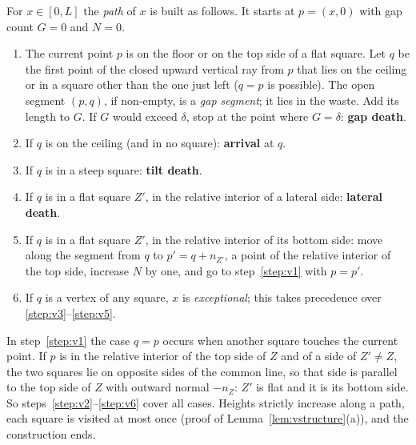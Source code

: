\documentclass[11pt,letterpaper]{amsart}
\theoremstyle{plain}
\theoremstyle{definition}
\theoremstyle{remark}
\begin{document}
For $x\in[0,L]$ the \emph{path} of $x$ is built as follows. It starts at $p=(x,0)$ with gap count $G=0$ and $N=0$.
\begin{enumerate}
\item\label{step:v1} The current point $p$ is on the floor or on the top side of a flat square. Let $q$ be the first point of the closed upward vertical ray from $p$ that lies on the ceiling or in a square other than the one just left ($q=p$ is possible). The open segment $(p,q)$, if non-empty, is a \emph{gap segment}; it lies in the waste. Add its length to $G$. If $G$ would exceed $\delta$, stop at the point where $G=\delta$: \textbf{gap death}.
\item\label{step:v2} If $q$ is on the ceiling (and in no square): \textbf{arrival} at $q$.
\item\label{step:v3} If $q$ is in a steep square: \textbf{tilt death}.
\item If $q$ is in a flat square $Z'$, in the relative interior of a lateral side: \textbf{lateral death}.
\item\label{step:v5} If $q$ is in a flat square $Z'$, in the relative interior of its bottom side: move along the segment from $q$ to $p'=q+n_{Z'}$, a point of the relative interior of the top side, increase $N$ by one, and go to step~\ref{step:v1} with $p=p'$.
\item\label{step:v6} If $q$ is a vertex of any square, $x$ is \emph{exceptional}; this takes precedence over \ref{step:v3}--\ref{step:v5}.
\end{enumerate}
In step~\ref{step:v1} the case $q=p$ occurs when another square touches the current point. If $p$ is in the relative interior of the top side of $Z$ and of a side of $Z'\ne Z$, the two squares lie on opposite sides of the common line, so that side is parallel to the top side of $Z$ with outward normal $-n_Z$: $Z'$ is flat and it is its bottom side. So steps~\ref{step:v2}--\ref{step:v6} cover all cases. Heights strictly increase along a path, each square is visited at most once (proof of Lemma~\ref{lem:vstructure}(a)), and the construction ends.
\end{document}
